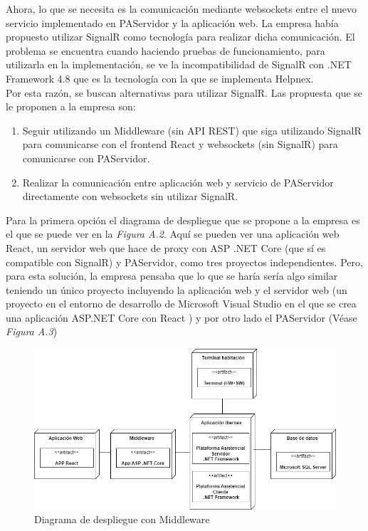 Ahora, lo que se necesita es la comunicación mediante websockets entre el nuevo servicio implementado en PAServidor y la aplicación web. La empresa había propuesto utilizar SignalR como tecnología para realizar dicha comunicación. El problema se encuentra cuando haciendo pruebas de funcionamiento, para utilizarla en la implementación, se ve la incompatibilidad de SignalR con .NET Framework 4.8 que es la tecnología con la que se implementa Helpnex.\\

Por esta razón, se buscan alternativas para utilizar SignalR. Las propuesta que se le proponen a la empresa son: 
\begin{enumerate}
    \item Seguir utilizando un Middleware (sin API REST) que siga utilizando SignalR para comunicarse con el frontend React y websockets (sin SignalR) para comunicarse con PAServidor.
    \item Realizar la comunicación entre aplicación web y servicio de PAServidor directamente con websockets sin utilizar SignalR.
\end{enumerate}

Para la primera opción el diagrama de despliegue que se propone a la empresa es el que se puede ver en la \textit{Figura A.2}. Aquí se pueden ver una aplicación web React, un servidor web que hace de proxy con ASP .NET Core (que sí es compatible con SignalR) y PAServidor, como tres proyectos independientes. Pero, para esta solución, la empresa pensaba que lo que se haría sería algo similar teniendo un único proyecto incluyendo la aplicación web y el servidor web (un proyecto en el entorno de desarrollo de Microsoft Visual Studio en el que se crea una aplicación ASP.NET Core con React \cite{vs-project} ) y por otro lado el PAServidor (Véase \textit{Figura A.3})\\

\begin{figure}[H]
    \centering
    \includegraphics[width=15cm]{Imagenes/Arquitectura-despliegue-2}
    \caption{Diagrama de despliegue con Middleware}
    \label{fig:despliegue-2}
\end{figure}


